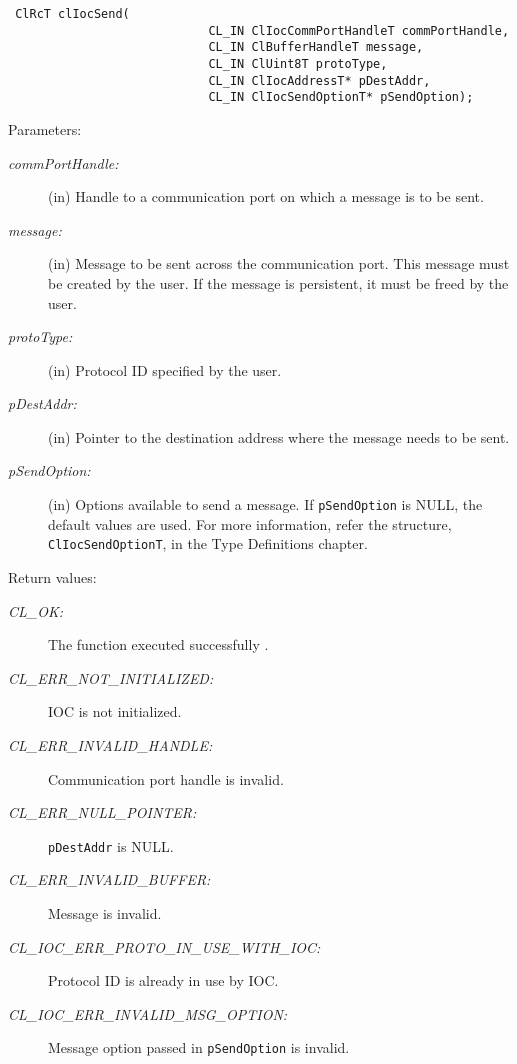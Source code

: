 \begin{flushleft}
\begin{Desc}
\footnotesize\begin{verbatim} ClRcT clIocSend(
                  			CL_IN ClIocCommPortHandleT commPortHandle,
                  			CL_IN ClBufferHandleT message,
                  			CL_IN ClUint8T protoType,
                  			CL_IN ClIocAddressT* pDestAddr,
                  			CL_IN ClIocSendOptionT* pSendOption);
\end{verbatim}
\normalsize
\end{Desc}
\begin{Desc}
\item[Parameters:]
\begin{description}
\item[{\em comm\-Port\-Handle:}](in) Handle to a communication port on which a message is to be sent.
\item[{\em message:}](in) Message to be sent across the communication port. This message must be created by the user. If the message is persistent, it 
must be freed by the user.
\item[{\em proto\-Type:}](in) Protocol ID specified by the user.
\item[{\em p\-Dest\-Addr:}](in) Pointer to the destination address where the message needs to be sent. 
\item[{\em p\-Send\-Option:}](in) Options available to send a message. If {\tt{p\-Send\-Option}} is NULL, the default values are used.
For more information, refer the structure, {\tt{ClIocSendOptionT}}, in the Type Definitions chapter.
\end{description}
\end{Desc}
\begin{Desc}
\item[Return values:]
\begin{description}
\item[{\em CL\_\-OK:}]The function executed successfully . 
\item[{\em CL\_\-ERR\_\-NOT\_\-INITIALIZED:}]IOC is not initialized. 
\item[{\em CL\_\-ERR\_\-INVALID\_\-HANDLE:}] Communication port handle is invalid. 
\item[{\em CL\_\-ERR\_\-NULL\_\-POINTER:}]{\tt{p\-Dest\-Addr}} is NULL. 
\item[{\em CL\_\-ERR\_\-INVALID\_\-BUFFER:}]Message is invalid. 
\item[{\em CL\_\-IOC\_\-ERR\_\-PROTO\_\-IN\_\-USE\_\-WITH\_\-IOC:}]Protocol ID is already in use by IOC. 
\item[{\em CL\_\-IOC\_\-ERR\_\-INVALID\_\-MSG\_\-OPTION:}]Message option passed in {\tt{p\-Send\-Option}} is invalid. 

\end{description}
\end{Desc}
\end{flushleft}
